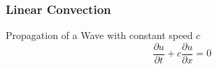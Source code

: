 %
%
%

\begin{frame}
  \frametitle{Linear Convection}
  Propagation of a Wave with constant speed $c$
  $$ \frac{\partial u}{\partial t} + c \frac{\partial u}{\partial x} = 0 $$
\end{frame}


